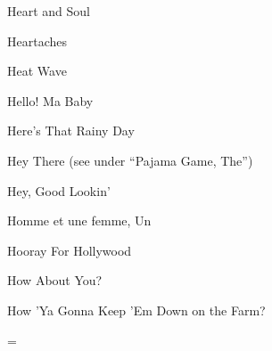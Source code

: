 \N Heart and Soul

\N Heartaches

\N Heat Wave

\N Hello! Ma Baby

\N Here's That Rainy Day

\N Hey There
\nobreak
\T (see under ``Pajama Game, The'')

\N Hey, Good Lookin'

\N Homme et une femme, Un

\N Hooray For Hollywood

\N How About You?

\N How 'Ya Gonna Keep 'Em Down on the Farm?

\singlecolumn
\vfil\eject
\ifseparate
\else
\pagecnt=\pageno
\fi
\endinput

